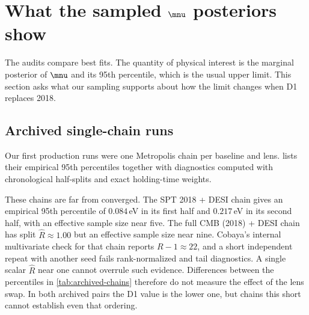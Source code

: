\section{What the sampled \texorpdfstring{$\mnu$}{neutrino-mass} posteriors show}
\label{sec:results-mnu}

The audits compare best fits. The quantity of physical interest is the marginal posterior of $\mnu$ and its 95th percentile, which is the usual upper limit. This section asks what our sampling supports about how the limit changes when D1 replaces 2018.

\subsection{Archived single-chain runs}
Our first production runs were one Metropolis chain per baseline and lens.  lists their empirical 95th percentiles together with diagnostics computed with chronological half-splits and exact holding-time weights.

\begin{table}[t]
  \centering
  \caption{Archived single-chain $\mnu$ runs. Percentiles are empirical summaries of the stored samples after removing the first 20\% of rows. ``First half'' and ``second half'' are chronological halves of the retained chain. Split $\hat R$ and the effective-sample-size proxy are classical scalar diagnostics. None of these runs meets the convergence criteria of \cref{sec:mnu-inference}, so the percentiles are not posterior bounds.}
  \label{tab:archived-chains}
  \small
  
\end{table}

These chains are far from converged. The SPT 2018 + DESI chain gives an empirical 95th percentile of $0.084$\,eV in its first half and $0.217$\,eV in its second half, with an effective sample size near five. The full CMB (2018) + DESI chain has split $\hat R\approx1.00$ but an effective sample size near nine. Cobaya's internal multivariate check for that chain reports $R-1\approx22$, and a short independent repeat with another seed fails rank-normalized and tail diagnostics. A single scalar $\hat R$ near one cannot overrule such evidence. Differences between the percentiles in \cref{tab:archived-chains} therefore do not measure the effect of the lens swap. In both archived pairs the D1 value is the lower one, but chains this short cannot establish even that ordering.

